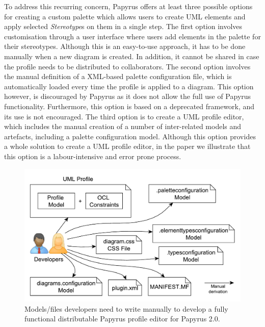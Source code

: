 To address this recurring concern, Papyrus offers at least three possible options for creating a custom palette which allows users to create UML elements and apply selected \textit{Stereotype}s on them in a single step. 
The first option involves customisation through a user interface where users add elements in the palette for their stereotypes. 
Although this is an easy-to-use approach, it has to be done manually when a new diagram is created. 
In addition, it cannot be shared in case the profile needs to be distributed to collaborators. 
The second option involves the manual definition of a XML-based palette configuration file, which is automatically loaded every time the profile is applied to a diagram. 
This option however, is discouraged by Papyrus as it does not allow the full use of Papyrus functionality.
Furthermore, this option is based on a deprecated framework, and its use is not encouraged.  
The third option is to create a UML profile editor, which includes the manual creation of a number of inter-related models and artefacts, including a palette configuration model. 
Although this option provides a whole solution to create a UML profile editor, in the paper we illustrate that this option is a labour-intensive and error prone process.

\begin{figure}[ht]
	\centering
	\includegraphics[width=1\textwidth]{diagrams/neededPapyrusFiles.pdf}
	\vspace{-3mm}
	\caption[]{Models/files developers need to write manually to 
		develop a fully functional distributable Papyrus profile editor for Papyrus 2.0.}
	\label{fig:neededPapyrusFiles}
	\vspace*{-3mm}
\end{figure}

